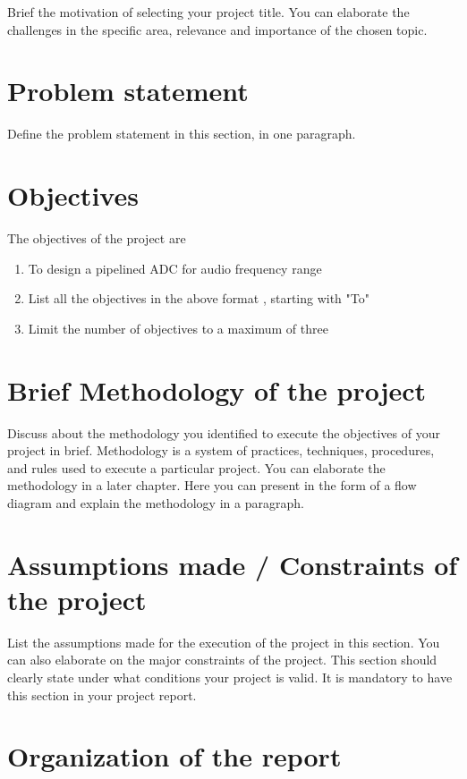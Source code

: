 Brief the motivation of selecting your project title. You can elaborate the challenges in the specific area, relevance and importance of the chosen topic. 

\section[Problem statement]{\textbf{Problem statement}}

Define the problem statement in this section, in one paragraph.

\section[Objectives]{\textbf{Objectives}}
The objectives of the project are
\begin{enumerate}
\item To design a pipelined ADC for audio frequency range
\item List all the objectives in the above format , starting with "To"
\item Limit the number of objectives to a maximum of three
\end{enumerate}

\section[Brief Methodology of the project]{\textbf{Brief Methodology of the project}}
Discuss about the methodology you identified to execute the objectives of your project in brief. Methodology is a system of practices, techniques, procedures, and rules used to execute a particular project. You can elaborate the methodology in a later chapter. Here you can present in the form of a flow diagram and explain the methodology in a paragraph.

\section[Assumptions made / Constraints of the project]{\textbf{Assumptions made / Constraints of the project}}

List the assumptions made for the execution of the project in this section. You can also elaborate on the major constraints of the project. This section should clearly state under what conditions your project is valid. It is mandatory to have this section in your project report.

\section[Organization of the report]{\textbf{Organization of the report}}

